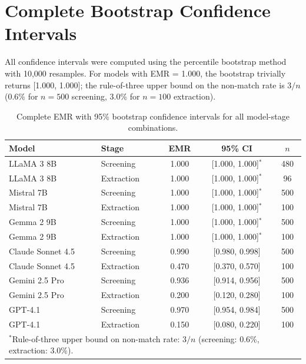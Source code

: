 \documentclass[11pt]{article}
\newenvironment{fittab}{\begin{lrbox}{\fittabbox}}{\end{lrbox}%
  \ifdim\wd\fittabbox>\linewidth\resizebox{\linewidth}{!}{\usebox{\fittabbox}}\else\usebox{\fittabbox}\fi}
\begin{document}
\section{Complete Bootstrap Confidence Intervals}
\label{sec:bootstrap}

All confidence intervals were computed using the percentile bootstrap method with 10,000 resamples.
For models with EMR = 1.000, the bootstrap trivially returns [1.000, 1.000]; the rule-of-three upper bound on the non-match rate is $3/n$ (0.6\% for $n = 500$ screening, 3.0\% for $n = 100$ extraction).

\begin{table}[htbp]
\centering
\caption{Complete EMR with 95\% bootstrap confidence intervals for all model-stage combinations.}
\small
\begin{fittab}\begin{tabular}{llccc}
\toprule
\textbf{Model} & \textbf{Stage} & \textbf{EMR} & \textbf{95\% CI} & \textbf{$n$} \\
\midrule
LLaMA 3 8B       & Screening  & 1.000 & [1.000, 1.000]$^*$ & 480 \\
LLaMA 3 8B       & Extraction & 1.000 & [1.000, 1.000]$^*$ & 96 \\
Mistral 7B        & Screening  & 1.000 & [1.000, 1.000]$^*$ & 500 \\
Mistral 7B        & Extraction & 1.000 & [1.000, 1.000]$^*$ & 100 \\
Gemma 2 9B        & Screening  & 1.000 & [1.000, 1.000]$^*$ & 500 \\
Gemma 2 9B        & Extraction & 1.000 & [1.000, 1.000]$^*$ & 100 \\
\midrule
Claude Sonnet 4.5 & Screening  & 0.990 & [0.980, 0.998] & 500 \\
Claude Sonnet 4.5 & Extraction & 0.470 & [0.370, 0.570] & 100 \\
Gemini 2.5 Pro    & Screening  & 0.936 & [0.914, 0.956] & 500 \\
Gemini 2.5 Pro    & Extraction & 0.200 & [0.120, 0.280] & 100 \\
GPT-4.1           & Screening  & 0.970 & [0.954, 0.984] & 500 \\
GPT-4.1           & Extraction & 0.150 & [0.080, 0.220] & 100 \\
\bottomrule
\multicolumn{5}{l}{\footnotesize $^*$Rule-of-three upper bound on non-match rate: $3/n$ (screening: 0.6\%, extraction: 3.0\%).}
\end{tabular}\end{fittab}
\end{table}
\end{document}
